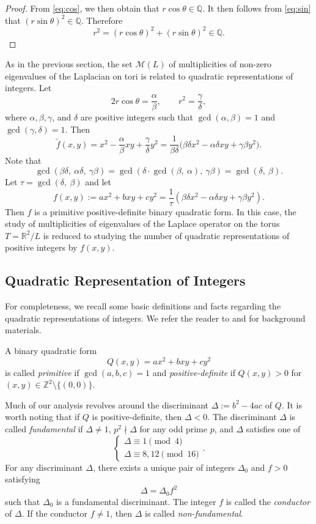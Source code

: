 \documentclass[11pt]{amsart}
\theoremstyle{definition}
\def\R{{\mathbb R}}
\begin{document}
\begin{proof}
From \eqref{eq:cos}, we then obtain that \( r \cos \theta \in \mathbb{Q} \).  It then follows from \eqref{eq:sin} that \( (r\sin\theta)^2 \in \mathbb{Q} \).  
Therefore
\[
r^2 = (r\cos\theta)^2 + (r\sin\theta)^2 \in \mathbb{Q}.
\]
\end{proof}

As in the previous section, the set \( \mathcal{M} (L)\) of multiplicities of non-zero eigenvalues of the Laplacian on tori is related to quadratic representations of integers. Let
\[
2r\cos\theta = \frac{\alpha}{\beta}, \qquad r^2 = \frac{\gamma}{\delta},
\]
where $\alpha, \beta, \gamma$, and $\delta$ are positive integers such that $\gcd(\alpha, \beta)=1$ and $\gcd(\gamma, \delta)=1$. Then
\[
\tilde{f}(x, y) = x^2 - \frac{\alpha}{\beta} xy + \frac{\gamma}{\delta} y^2
= \frac{1}{\beta\delta} \bigl( \beta\delta  x^2 - \alpha\delta xy + \gamma\beta y^2 \bigr).
\]
Note that
\[
\gcd(\beta\delta, \ \alpha\delta,\ \gamma\beta)=\gcd(\delta\cdot\gcd(\beta,\ \alpha),\ \gamma\beta)
=\gcd(\delta,\ \beta).
\]
Let $\tau=\gcd(\delta,\ \beta)$ and let
\[
f(x,y) := a x^2 + b xy + c y^2=\frac{1}{\tau}(\beta\delta x^2 - \alpha\delta xy + \gamma\beta y^2).
\]
Then $f$ is a primitive positive-definite binary quadratic form. In this case, the study of multiplicities of eigenvalues of the Laplace operator on the torus \( T=\R^2/L \) is reduced to studying 
the number of quadratic representations of positive integers by $f(x, y)$.

\subsection{Quadratic Representation of Integers}\label{s:prelim:q}

For completeness, we recall some basic definitions and facts regarding the quadratic representations of integers. We refer the reader to \cite[Chapter 3]{Niven-et-al} and \cite{Cox}
for background materials. 

A binary quadratic form 
\[
Q(x,y)=ax^2+bxy+cy^2
\]
is called \textit{primitive} if $\gcd(a,b,c)=1$ and \textit{positive-definite} if $Q(x,y)>0$ for $(x,y)\in\mathbb{Z}^2\setminus\{(0,0)\}$.

Much of our analysis revolves around the discriminant $\Delta:=b^2-4ac$ of $Q$. It is worth noting that if $Q$ is positive-definite, then $\Delta<0$. The discriminant $\Delta$ is called \textit{fundamental} if $\Delta\neq 1$, $p^2\nmid \Delta$ for any odd prime $p$, and $\Delta$ satisfies one of 
\[
 \begin{cases}
     \Delta\equiv 1\pmod{4}\\
     \Delta\equiv 8,12\pmod{16}
 \end{cases}.
\]
For any discriminant $\Delta$, there exists a unique pair of integers $\Delta_0$ and $f>0$ satisfying
\[
\Delta=\Delta_0f^2
\]
such that $\Delta_0$ is a fundamental discriminant. The integer $f$ is called the \textit{conductor} of $\Delta$. If the conductor $f\neq 1$, then $\Delta$ is called \textit{non-fundamental}.
\end{document}
